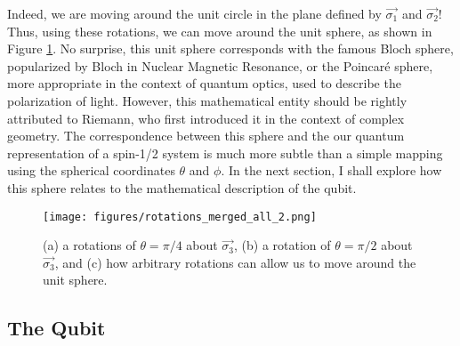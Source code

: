 Indeed, we are moving around the unit circle in the plane defined by $\vec{\sigma_1}$ and $\vec{\sigma_2}$! Thus, using these rotations, we can move around the unit sphere, as shown in Figure \ref{fig:riemann_sphere}. No surprise, this unit sphere corresponds with the famous Bloch sphere, popularized by Bloch in Nuclear Magnetic Resonance, or the Poincaré sphere, more appropriate in the context of quantum optics, used to describe the polarization of light. However, this mathematical entity should be rightly attributed to Riemann, who first introduced it in the context of complex geometry. The correspondence between this sphere and the our quantum representation of a spin-1/2 system is much more subtle than a simple mapping using the spherical coordinates $\theta$ and $\phi$. In the next section, I shall explore how this sphere relates to the mathematical description of the qubit.

\begin{figure}[H]
   \centering
   \texttt{[image: figures/rotations\_merged\_all\_2.png]}
   \caption{ (a) a rotations of $\theta = \pi/4$ about $\vec{\sigma_3}$, (b) a rotation of $\theta = \pi/2$ about $\vec{\sigma_3}$, and (c) how arbitrary rotations can allow us to move around the unit sphere.}
   \label{fig:riemann_sphere}
\end{figure}



\subsection{The Qubit}


